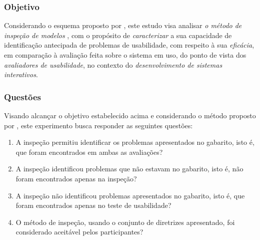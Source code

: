 \subsubsection{Objetivo}
\label{studyGoal}

Considerando          o          esquema         proposto          por
, este  estudo visa analisar
           {\em  o  método de  inspeção  de  modelos  \aladim}, com  o
           propósito  de  {\em   caracterizar}  a  sua  capacidade  de
           identificação antecipada  de problemas de  usabilidade, com
           respeito à  sua {\em  eficácia}, em comparação  à avaliação
           feita sobre  o sistema em uso,  do ponto de  vista dos {\em
             avaliadores   de  usabilidade},   no  contexto   do  {\em
             desenvolvimento de sistemas interativos}.

\subsubsection{Questões}
\label{studyQuestions}

Visando alcançar o objetivo estabelecido acima e considerando o método
proposto  por  ,  este  experimento
busca responder as seguintes questões:

\begin{enumerate}
  \renewcommand{\labelenumi}{$Q_{\arabic{enumi}}$}

  \item A  inspeção permitiu identificar os  problemas apresentados no
    gabarito, isto é, que foram encontrados em ambas as avaliações?

  \item A inspeção identificou  problemas que não estavam no gabarito,
    isto é, não foram encontrados apenas na inspeção?

  \item A inspeção não identificou problemas apresentados no gabarito,
    isto é, que foram encontrados apenas no teste de usabilidade?

  \item  O  método  de  inspeção,  usando  o  conjunto  de  diretrizes
    apresentado, foi considerado aceitável pelos participantes?

\end{enumerate}

